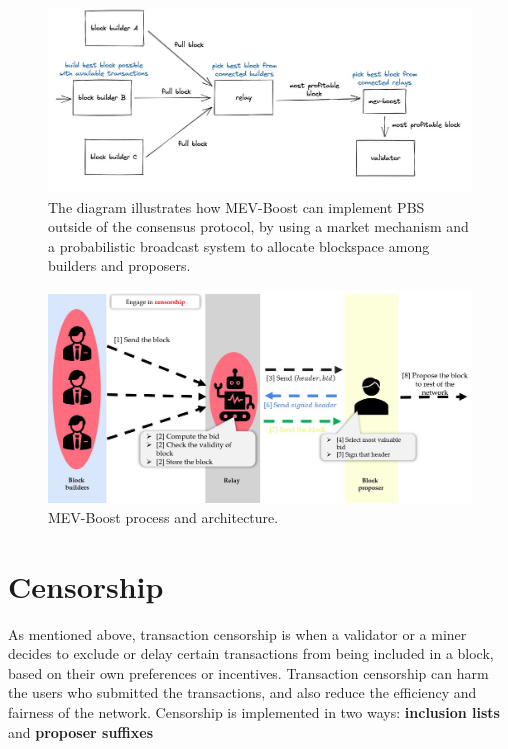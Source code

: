 \documentclass{report}
\begin{document}
  \begin{center}
  	\begin{figure}
  		\centering
  		\includegraphics[width=1\linewidth]{Fig/F6}
  		\caption{The diagram illustrates how MEV-Boost can implement PBS outside of the consensus protocol, by using a market mechanism and a probabilistic broadcast system to allocate blockspace among builders and proposers.}
  		\label{fig:f6}
  	\end{figure}
  \end{center}
  \begin{center}
	\begin{figure}
		\centering
		\includegraphics[width=1\linewidth]{Fig/F7}
		\caption{MEV-Boost process and architecture.}
		\label{fig:f7}
	\end{figure}
\end{center}
\section{Censorship}
As mentioned above, transaction censorship is when a validator or a miner decides to exclude or delay certain transactions from being included in a block, based on their own preferences or incentives. Transaction censorship can harm the users who submitted the transactions, and also reduce the efficiency and fairness of the network.
Censorship is implemented in two ways: \textbf{inclusion lists} and \textbf{proposer suffixes}
\end{document}
